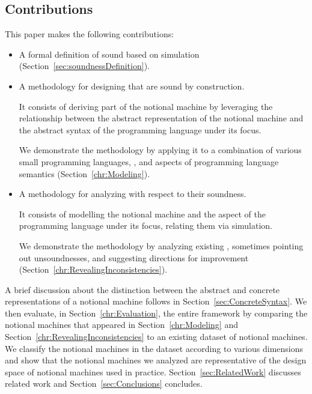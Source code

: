 \subsection{Contributions}
This paper makes the following contributions:
\begin{itemize}
    \item A formal definition of sound \nm{} based on simulation (Section~\ref{sec:soundnessDefinition}).
    \item A methodology for designing \nms{} that are sound by construction.

        It consists of
        deriving part of the notional machine
        by leveraging
        the relationship between
        the abstract representation of the notional machine
        and
        the abstract syntax of the programming language under its focus.

        We demonstrate the methodology by applying it
        to a combination of various
        small programming languages,
        \nms{},
        and
        aspects of programming language semantics
        (Section~\ref{chr:Modeling}).

    \item A methodology for analyzing \nms{} with respect to their soundness.

        It consists of
        modelling the notional machine and
        the aspect of the programming language under its focus,
        relating them via simulation. %

        We
        demonstrate
        the methodology by
        analyzing
        existing \nms{},
        sometimes
        pointing out unsoundnesses, and suggesting directions for improvement (Section~\ref{chr:RevealingInconsistencies}).
\end{itemize}


A brief discussion about the distinction between the abstract and concrete representations of a notional machine
follows
in Section~\ref{sec:ConcreteSyntax}.
We then
evaluate, in Section~\ref{chr:Evaluation}, the entire framework  %
by comparing the notional machines that appeared
in Section~\ref{chr:Modeling} and Section~\ref{chr:RevealingInconsistencies}
to an existing dataset of \numOfNMs notional machines.
We classify the notional machines in the dataset according to various dimensions and show that the notional machines we analyzed are representative of the design space of notional machines used in practice.
Section~\ref{sec:RelatedWork} discusses related work
and Section~\ref{sec:Conclusions} concludes.


